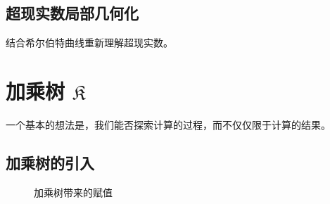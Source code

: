 \documentclass[a4paper,12pt]{article}
\begin{document}
\newpage

\subsection{超现实数局部几何化}

结合希尔伯特曲线重新理解超现实数。

\newpage

\section{加乘树 $\mathfrak{K}$}

一个基本的想法是，我们能否探索计算的过程，而不仅仅限于计算的结果。

\subsection{加乘树的引入}

\begin{figure}[ht]
\centering
{}
\caption{加乘树带来的赋值}
\end{figure}
\end{document}
